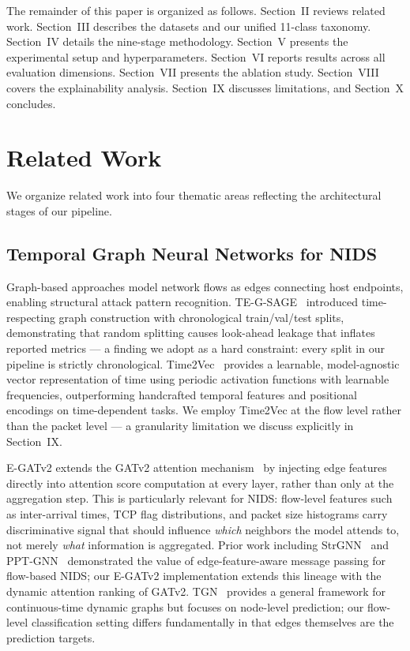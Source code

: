 \documentclass[compsoc,journal]{IEEEtran}
\begin{document}
The remainder of this paper is organized as follows. Section~II reviews related work. Section~III describes the datasets and our unified 11-class taxonomy. Section~IV details the nine-stage methodology. Section~V presents the experimental setup and hyperparameters. Section~VI reports results across all evaluation dimensions. Section~VII presents the ablation study. Section~VIII covers the explainability analysis. Section~IX discusses limitations, and Section~X concludes.

\section{Related Work}

We organize related work into four thematic areas reflecting the architectural stages of our pipeline.

\subsection{Temporal Graph Neural Networks for NIDS}

Graph-based approaches model network flows as edges connecting host endpoints, enabling structural attack pattern recognition. TE-G-SAGE~\cite{tegsage} introduced time-respecting graph construction with chronological train/val/test splits, demonstrating that random splitting causes look-ahead leakage that inflates reported metrics — a finding we adopt as a hard constraint: every split in our pipeline is strictly chronological. Time2Vec~\cite{kazemi2019time2vec} provides a learnable, model-agnostic vector representation of time using periodic activation functions with learnable frequencies, outperforming handcrafted temporal features and positional encodings on time-dependent tasks. We employ Time2Vec at the flow level rather than the packet level — a granularity limitation we discuss explicitly in Section~IX.

E-GATv2 extends the GATv2 attention mechanism~\cite{brody2022gatv2} by injecting edge features directly into attention score computation at every layer, rather than only at the aggregation step. This is particularly relevant for NIDS: flow-level features such as inter-arrival times, TCP flag distributions, and packet size histograms carry discriminative signal that should influence \textit{which} neighbors the model attends to, not merely \textit{what} information is aggregated. Prior work including StrGNN~\cite{strgnn} and PPT-GNN~\cite{pptgnn} demonstrated the value of edge-feature-aware message passing for flow-based NIDS; our E-GATv2 implementation extends this lineage with the dynamic attention ranking of GATv2. TGN~\cite{rossi2020temporal} provides a general framework for continuous-time dynamic graphs but focuses on node-level prediction; our flow-level classification setting differs fundamentally in that edges themselves are the prediction targets.
\end{document}
